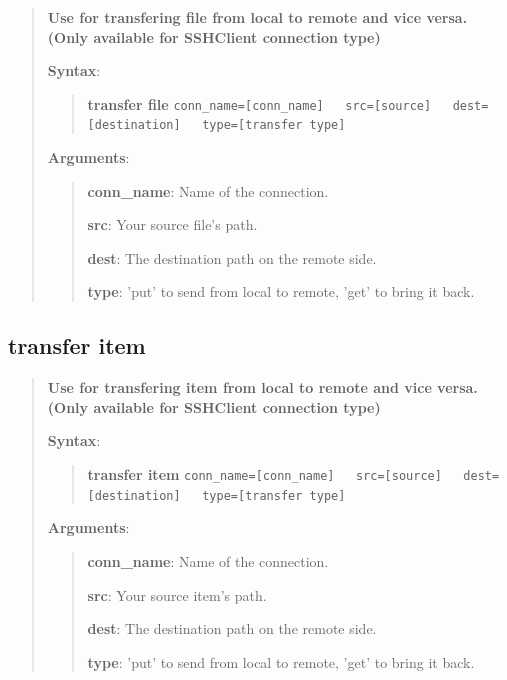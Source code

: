\begin{quote}
\textbf{Use for transfering file from local to remote and vice versa. (Only available for SSHClient connection type)}

\textbf{Syntax}:

\begin{quote}

\textbf{transfer file}
\texttt{conn\_name={[}conn\_name{]}\ \ \ src={[}source{]}\ \ \ dest={[}destination{]}\ \ \ type={[}transfer type{]}}
\end{quote}

\textbf{Arguments}:

\begin{quote}
\textbf{conn\_name}: Name of the connection.

\textbf{src}: Your source file's path.

\textbf{dest}: The destination path on the remote side.

\textbf{type}: 'put' to send from local to remote, 'get' to bring it back.
\end{quote}
\end{quote}

\hypertarget{description-transfer-item}{%
\subsection{\texorpdfstring{\textbf{transfer item}}{transfer item}}\label{description-transfer-item}}

\begin{quote}
\textbf{Use for transfering item from local to remote and vice versa. (Only available for SSHClient connection type)}

\textbf{Syntax}:

\begin{quote}

\textbf{transfer item}
\texttt{conn\_name={[}conn\_name{]}\ \ \ src={[}source{]}\ \ \ dest={[}destination{]}\ \ \ type={[}transfer type{]}}
\end{quote}

\textbf{Arguments}:

\begin{quote}
\textbf{conn\_name}: Name of the connection.

\textbf{src}: Your source item's path.

\textbf{dest}: The destination path on the remote side.

\textbf{type}: 'put' to send from local to remote, 'get' to bring it back.
\end{quote}
\end{quote}


